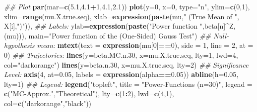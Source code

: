 \documentclass[]{book}
\newenvironment{Shaded}{\begin{snugshade}}{\end{snugshade}}
\newcommand{\CommentTok}[1]{\textcolor[rgb]{0.56,0.35,0.01}{\textit{#1}}}
\newcommand{\DataTypeTok}[1]{\textcolor[rgb]{0.13,0.29,0.53}{#1}}
\newcommand{\DecValTok}[1]{\textcolor[rgb]{0.00,0.00,0.81}{#1}}
\newcommand{\FloatTok}[1]{\textcolor[rgb]{0.00,0.00,0.81}{#1}}
\newcommand{\KeywordTok}[1]{\textcolor[rgb]{0.13,0.29,0.53}{\textbf{#1}}}
\newcommand{\NormalTok}[1]{#1}
\newcommand{\OperatorTok}[1]{\textcolor[rgb]{0.81,0.36,0.00}{\textbf{#1}}}
\newcommand{\StringTok}[1]{\textcolor[rgb]{0.31,0.60,0.02}{#1}}
\theoremstyle{definition}
\theoremstyle{definition}
\theoremstyle{definition}
\theoremstyle{remark}
\begin{document}
\begin{Shaded}
\begin{Highlighting}[]
\CommentTok{## Plot}
\KeywordTok{par}\NormalTok{(}\DataTypeTok{mar=}\KeywordTok{c}\NormalTok{(}\FloatTok{5.1}\NormalTok{,}\FloatTok{4.1}\OperatorTok{+}\DecValTok{1}\NormalTok{,}\FloatTok{4.1}\NormalTok{,}\FloatTok{2.1}\NormalTok{))}
\KeywordTok{plot}\NormalTok{(}\DataTypeTok{y=}\DecValTok{0}\NormalTok{, }\DataTypeTok{x=}\DecValTok{0}\NormalTok{, }\DataTypeTok{type=}\StringTok{"n"}\NormalTok{,}
     \DataTypeTok{ylim=}\KeywordTok{c}\NormalTok{(}\DecValTok{0}\NormalTok{,}\DecValTok{1}\NormalTok{),}
     \DataTypeTok{xlim=}\KeywordTok{range}\NormalTok{(mu.X.true.seq), }
     \DataTypeTok{xlab=}\KeywordTok{expression}\NormalTok{(}\KeywordTok{paste}\NormalTok{(mu,}\StringTok{" (True Mean of "}\NormalTok{, X[i],}\StringTok{")"}\NormalTok{)), }
     \CommentTok{## Labels:}
     \DataTypeTok{ylab=}\KeywordTok{expression}\NormalTok{(}\KeywordTok{paste}\NormalTok{(}\StringTok{"Power function "}\NormalTok{,beta[n]}\OperatorTok{^}\NormalTok{Z,(mu))), }
     \DataTypeTok{main=}\StringTok{"Power function of the (One-Sided) Gauss Test"}\NormalTok{)}
\CommentTok{## Null-hypothesis mean:}
\KeywordTok{mtext}\NormalTok{(}\DataTypeTok{text =} \KeywordTok{expression}\NormalTok{(mu[}\DecValTok{0}\NormalTok{]}\OperatorTok{==}\DecValTok{0}\NormalTok{), }\DataTypeTok{side =} \DecValTok{1}\NormalTok{, }\DataTypeTok{line =} \DecValTok{2}\NormalTok{, }\DataTypeTok{at =} \DecValTok{0}\NormalTok{)}
\CommentTok{## Trajectories:}
\KeywordTok{lines}\NormalTok{(}\DataTypeTok{y=}\NormalTok{beta.MC.n}\FloatTok{.30}\NormalTok{, }\DataTypeTok{x=}\NormalTok{mu.X.true.seq, }\DataTypeTok{lty=}\DecValTok{1}\NormalTok{, }\DataTypeTok{lwd=}\DecValTok{4}\NormalTok{, }\DataTypeTok{col=}\StringTok{"darkorange"}\NormalTok{)}
\KeywordTok{lines}\NormalTok{(}\DataTypeTok{y=}\NormalTok{beta.n}\FloatTok{.30}\NormalTok{,    }\DataTypeTok{x=}\NormalTok{mu.X.true.seq, }\DataTypeTok{lty=}\DecValTok{2}\NormalTok{)}
\CommentTok{## Significance Level:}
\KeywordTok{axis}\NormalTok{(}\DecValTok{4}\NormalTok{, }\DataTypeTok{at=}\FloatTok{0.05}\NormalTok{, }\DataTypeTok{labels =} \KeywordTok{expression}\NormalTok{(alpha}\OperatorTok{==}\FloatTok{0.05}\NormalTok{))}
\KeywordTok{abline}\NormalTok{(}\DataTypeTok{h=}\FloatTok{0.05}\NormalTok{, }\DataTypeTok{lty=}\DecValTok{1}\NormalTok{)}
\CommentTok{## Legend:}
\KeywordTok{legend}\NormalTok{(}\StringTok{"topleft"}\NormalTok{, }\DataTypeTok{title =} \StringTok{"Power-Functions (n=30)"}\NormalTok{, }
       \DataTypeTok{legend =} \KeywordTok{c}\NormalTok{(}\StringTok{"MC-Approx."}\NormalTok{,}\StringTok{"Theoretical"}\NormalTok{), }
       \DataTypeTok{lty=}\KeywordTok{c}\NormalTok{(}\DecValTok{1}\OperatorTok{:}\DecValTok{2}\NormalTok{), }\DataTypeTok{lwd=}\KeywordTok{c}\NormalTok{(}\DecValTok{4}\NormalTok{,}\DecValTok{1}\NormalTok{), }\DataTypeTok{col=}\KeywordTok{c}\NormalTok{(}\StringTok{"darkorange"}\NormalTok{,}\StringTok{"black"}\NormalTok{))}
\end{Highlighting}
\end{Shaded}
\end{document}
